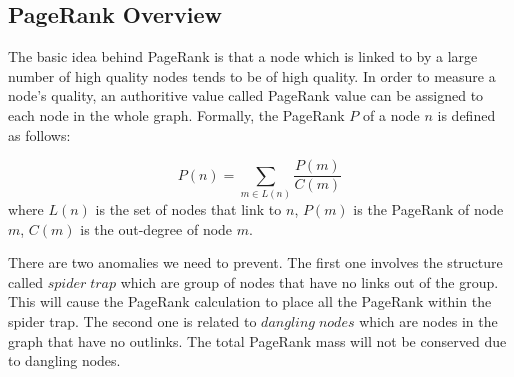 \documentclass[10pt,conference,compsocconf]{IEEEtran}
\begin{document}
\subsection{PageRank Overview}
The basic idea behind PageRank is that a node which is linked to by a large number of high quality nodes tends to be of high quality. In order to measure a node's quality, an authoritive value called PageRank value can be assigned to each node in the whole graph. Formally, the PageRank $P$ of a node $n$ is defined as follows:



\begin{equation}
P(n) = \sum_{m \in L(n)} \frac{P(m)}{C(m)} \label{eq:pr_1}
\end{equation}
where $L(n)$ is the set of nodes that link to $n$, $P(m)$ is the PageRank of node $m$, $C(m)$ is the out-degree of node $m$.


There are two anomalies we need to prevent. The first one involves the structure called $spider\;trap$ which are group of nodes that have no links out of the group. This will cause the PageRank calculation to place all the PageRank within the spider trap. The second one is related to $dangling\;nodes$ which are nodes in the graph that have no outlinks. The total PageRank mass will not be conserved due to dangling nodes. 
\end{document}
